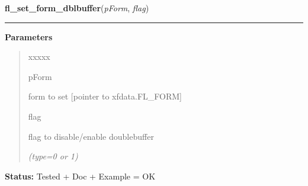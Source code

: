     \label{xformslib:library:fl_set_form_dblbuffer}

    \vspace{0.5ex}

\hspace{.8\funcindent}\begin{boxedminipage}{\funcwidth}

    \raggedright \textbf{fl\_set\_form\_dblbuffer}(\textit{pForm}, \textit{flag})

    \vspace{-1.5ex}

    \rule{\textwidth}{0.5\fboxrule}
\setlength{\parskip}{2ex}
\setlength{\parskip}{1ex}
      \textbf{Parameters}
      \vspace{-1ex}

      \begin{quote}
        \begin{Ventry}{xxxxx}

          \item[pForm]

          form to set [pointer to xfdata.FL\_FORM]

          \item[flag]

          flag to disable/enable doublebuffer

            {\it (type=0 or 1)}

        \end{Ventry}

      \end{quote}

\textbf{Status:} Tested + Doc + Example = OK



    \end{boxedminipage}

    \label{xformslib:library:fl_prepare_form_window}

    \vspace{0.5ex}

